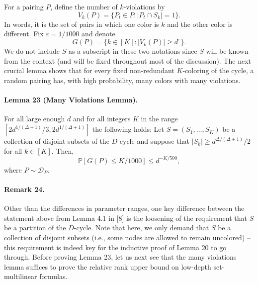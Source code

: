 \documentclass[10pt,a4paper]{article}
\begin{document}
For a pairing $P$, define the number of $k$-violations by
\[V_k(P)=\{P_t\in P:|P_t\cap S_k|=1\}.\]
In words, it is the set of pairs in which one color is $k$ and the other color is different. Fix $\varepsilon=1/1000$ and denote
\[G(P)=\{k\in[K]:|V_k(P)|\geq d^\varepsilon\}.\]
We do not include $S$ as a subscript in these two notations since $S$ will be known from the context (and will be fixed throughout most of the discussion). The next crucial lemma shows that for every fixed non-redundant $K$-coloring of the cycle, a random pairing has, with high probability, many colors with many violations.
\paragraph{Lemma 23 (Many Violations Lemma).} For all large enough $d$ and for all integers $K$ in the range $[2d^{1/(\Delta+1)}/3,2d^{1/(\Delta+1)}]$ the following holds: Let $S=(S_1,\ldots,S_K)$ be a collection of disjoint subsets of the $D$-cycle and suppose that $|S_k|\geq d^{\Delta/(\Delta+1)}/2$ for all $k\in[K]$. Then,
\[\mathbb P[G(P)\leq K/1000]\leq d^{-K/500},\]
where $P\sim\mathcal D_P$.
\paragraph{Remark 24.} Other than the differences in parameter ranges, one key difference between the statement above from Lemma 4.1 in [8] is the loosening of the requirement that $S$ be a partition of the $D$-cycle. Note that here, we only demand that $S$ be a collection of disjoint subsets (i.e., some nodes are allowed to remain uncolored) -- this requirement is indeed key for the inductive proof of Lemma 20 to go through.
Before proving Lemma 23, let us next see that the many violations lemma suffices to prove the relative rank upper bound on low-depth set-multilinear formulas.
\end{document}
